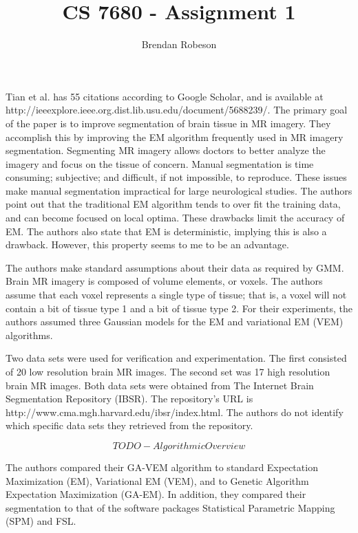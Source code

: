 \documentclass[11pt]{article}
\begin{document}
\title{CS 7680 - Assignment 1}
\author{Brendan Robeson}
\maketitle

Tian et al. \cite{5688239} has 55 citations according to Google Scholar, and is
available at \\ http://ieeexplore.ieee.org.dist.lib.usu.edu/document/5688239/.
The primary goal of the paper is to improve segmentation of brain tissue in MR
imagery. They accomplish this by improving the EM algorithm frequently used in
MR imagery segmentation. Segmenting MR imagery allows doctors to better analyze
the imagery and focus on the tissue of concern. Manual segmentation is time
consuming; subjective; and difficult, if not impossible, to reproduce. These
issues make manual segmentation impractical for large neurological studies. The
authors point out that the traditional EM algorithm tends to over fit the
training data, and can become focused on local optima. These drawbacks limit the
accuracy of EM. The authors also state that EM is deterministic, implying this
is also a drawback. However, this property seems to me to be an advantage.

The authors make standard assumptions about their data as required by GMM. Brain
MR imagery is composed of volume elements, or voxels. The authors assume that
each voxel represents a single type of tissue; that is, a voxel will not contain
a bit of tissue type 1 and a bit of tissue type 2. For their experiments, the
authors assumed three Gaussian models for the EM and variational EM (VEM)
algorithms.

Two data sets were used for verification and experimentation. The first
consisted of 20 low resolution brain MR images. The second set was 17 high
resolution brain MR images. Both data sets were obtained from The Internet Brain
Segmentation Repository (IBSR). The repository's URL is
http://www.cma.mgh.harvard.edu/ibsr/index.html. The authors do not identify
which specific data sets they retrieved from the repository.

\[TODO - Algorithmic Overview\]

The authors compared their GA-VEM algorithm to standard Expectation Maximization
(EM), Variational EM (VEM), and to Genetic Algorithm Expectation Maximization
(GA-EM). In addition, they compared their segmentation to that of the software
packages Statistical Parametric Mapping (SPM) and FSL.



\end{document}

